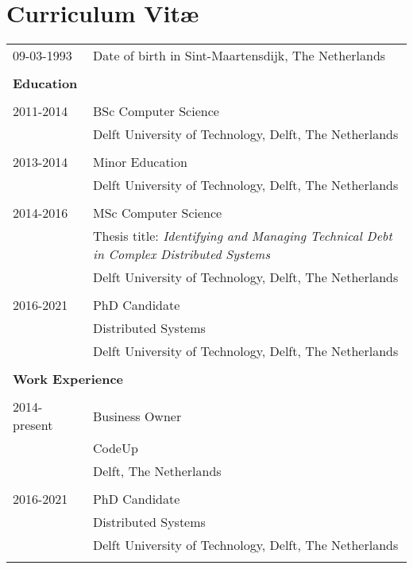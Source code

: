 \chapter*{Curriculum Vit\ae}

\makeatletter
\authors{\@firstname\ {\titleshape\@lastname}}
\makeatother

\noindent
\begin{longtable}{p{} p{}}
    09-03-1993	 & Date of birth in Sint-Maartensdijk, The Netherlands \\\\
    
    \large{\textbf{Education}} & \\\\
    2011-2014 & BSc Computer Science\\
    & Delft University of Technology, Delft, The Netherlands \\\\
    
    2013-2014 & Minor Education\\
    & Delft University of Technology, Delft, The Netherlands\\\\
    
    2014-2016 & MSc Computer Science\\
    & Thesis title: \emph{Identifying and Managing Technical Debt in Complex Distributed Systems}\\
    & Delft University of Technology, Delft, The Netherlands\\\\
    
    2016-2021 & PhD Candidate\\
    & Distributed Systems\\
    & Delft University of Technology, Delft, The Netherlands\\\\
    
    \multicolumn{2}{l}{\large{\textbf{Work Experience}}}\\\\
    
    2014-present & Business Owner\\
    & CodeUp\\
    & Delft, The Netherlands\\\\
    
    2016-2021 & PhD Candidate\\
    & Distributed Systems\\
    & Delft University of Technology, Delft, The Netherlands\\\\
\end{longtable}
